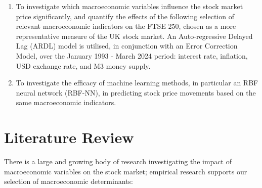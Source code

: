 \documentclass[12pt,a4paper]{article}
\begin{document}
\begin{enumerate}
    \item To investigate which macroeconomic variables influence the stock market price significantly, and quantify the effects of the following selection of relevant macroeconomic indicators on the FTSE 250, chosen as a more representative measure of the UK stock market. An Auto-regressive Delayed Lag (ARDL) model is utilised, in conjunction with an Error Correction Model, over the January 1993 - March 2024 period: interest rate, inflation, USD exchange rate, and M3 money supply. 
    \item To investigate the efficacy of machine learning methods, in particular an RBF neural network (RBF-NN), in predicting stock price movements based on the same macroeconomic indicators. 
\end{enumerate}

\section{Literature Review}

There is a large and growing body of research investigating the impact of macroeconomic variables on the stock market; empirical research supports our selection of macroeconomic determinants:
\end{document}
